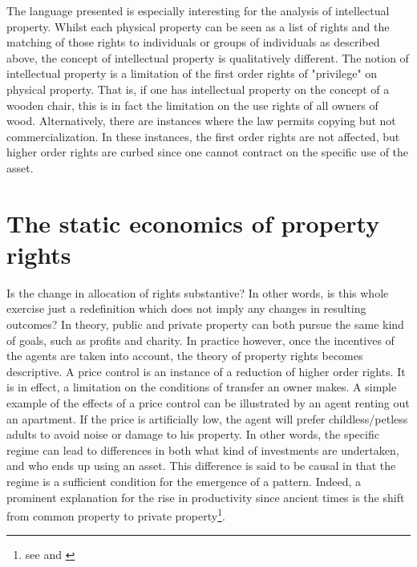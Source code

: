 The language presented is especially interesting for the analysis of intellectual property. Whilst each physical property can be seen as a list of rights and the matching of those rights to individuals or groups of individuals as described above, the concept of intellectual property is qualitatively different. The notion of intellectual property is a limitation of the first order rights of "privilege" on physical property. That is, if one has intellectual property on the concept of a wooden chair, this is in fact the limitation on the use rights of all owners of wood. Alternatively, there are instances where the law permits copying but not commercialization. In these instances, the first order rights are not affected, but higher order rights are curbed since one cannot contract on the specific use of the asset.


\section{The static economics of property rights}\label{static}

Is the change in allocation of rights substantive? In other words, is this whole exercise just a redefinition which does not imply any changes in resulting outcomes? In theory, public and private property can both pursue the same kind of goals, such as profits and charity. In practice however, once the incentives of the agents are taken into account, the theory of property rights becomes descriptive. A price control is an instance of a reduction of higher order rights. It is in effect, a limitation on the conditions of transfer an owner makes. A simple example of the effects of a price control can be illustrated by an agent renting out an apartment. If the price is artificially low, the agent will prefer childless/petless adults to avoid noise or damage to his property. In other words, the specific regime can lead to differences in both what kind of investments are undertaken, and who ends up using an asset. This difference is said to be causal in that the regime is a sufficient condition for the emergence of a pattern. Indeed, a prominent explanation for the rise in productivity since ancient times is the shift from common property to private property\footnote{see \cite{anderson1983privatizing} and \cite{north1973rise}}.

